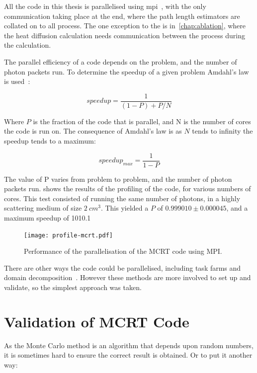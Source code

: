 All the code in this thesis is parallelised using \gls*{mpi}~\cite{gropp2014using,gropp2014usingadv}, with the only communication taking place at the end, where the path length estimators are collated on to all process.
The one exception to the is in~\cref{chap:ablation}, where the heat diffusion calculation needs communication between the process during the calculation.

The parallel efficiency of a code depends on the problem, and the number of photon packets run.
To determine the speedup of a given problem Amdahl's law is used~\cite{amdahl1967validity}:

\begin{equation}
speedup = \frac{1}{(1-P)+P/N}
\end{equation}

Where $P$ is the fraction of the code that is parallel, and N is the number of cores the code is run on.
The consequence of Amdahl's law is as $N$ tends to infinity the speedup tends to a maximum:

\begin{equation}
speedup_{max}=\frac{1}{1-P}
\end{equation}

The value of P varies from problem to problem, and the number of photon packets run.
 shows the results of the profiling of the code, for various numbers of cores.
This test consisted of running the same number of photons, in a highly scattering medium of size $2~cm^3$.
This yielded a $P$ of $0.999010 \pm 0.000045$, and a maximum speedup of 1010.1


\begin{figure}[!ht]
	\centering
	\texttt{[image: profile-mcrt.pdf]}
	\caption{Performance of the parallelisation of the MCRT code using MPI.}
	\label{fig:paratest}
\end{figure}


There are other ways the code could be parallelised, including task farms and domain decomposition~\cite{barney2010introduction}.
However these methods are more involved to set up and validate, so the simplest approach was taken.
\FloatBarrier
\section{Validation of MCRT Code}\label{sec:validation}

As the Monte Carlo method is an algorithm that depends upon random numbers, it is sometimes hard to ensure the correct result is obtained.
Or to put it another way:
\medskip

